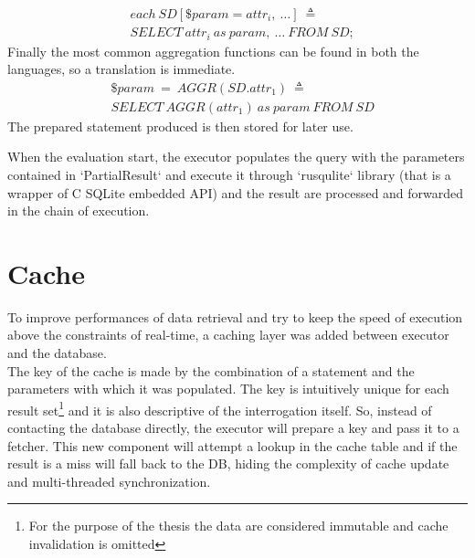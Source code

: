 \begin{align*}%
&each\ SD[\$param = attr_i,\ \ldots]\ \triangleq\\
&SELECT\ attr_i\ as\ param,\ \ldots\ FROM\ SD;
\end{align*}
Finally the most common aggregation functions can be found in both the languages, so a translation is immediate.
\begin{align*}%
&\$param\ =\ AGGR(SD.attr_1)\ \triangleq\\
&SELECT\ AGGR(attr_1)\ as\ param\ FROM\ SD
\end{align*}
The prepared statement produced is then stored for later use.

When the evaluation start, the executor populates the query with the parameters contained in `PartialResult` and execute it through `rusqulite` library (that is a wrapper of C SQLite embedded API) and the result are processed and forwarded in the chain of execution.

\section{Cache}
To improve performances of data retrieval and try to keep the speed of execution above the constraints of real-time, a caching layer was added between executor and the database.\\
The key of the cache is made by the combination of a statement and the parameters with which it was populated. The key is intuitively unique for each result set\footnote{For the purpose of the thesis the data are considered immutable and cache invalidation is omitted} and it is also descriptive of the interrogation itself. So, instead of contacting the database directly, the executor will prepare a key and pass it to a fetcher. This new component will attempt a lookup in the cache table and if the result is a miss will fall back to the DB, hiding the complexity of cache update and multi-threaded synchronization.

